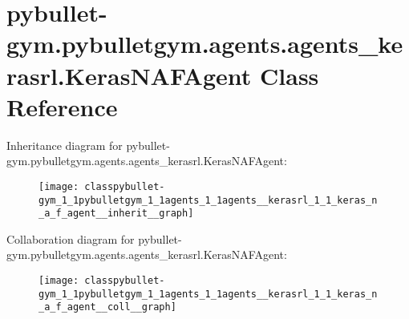 \hypertarget{classpybullet-gym_1_1pybulletgym_1_1agents_1_1agents__kerasrl_1_1_keras_n_a_f_agent}{}\section{pybullet-\/gym.pybulletgym.\+agents.\+agents\+\_\+kerasrl.\+Keras\+N\+A\+F\+Agent Class Reference}
\label{classpybullet-gym_1_1pybulletgym_1_1agents_1_1agents__kerasrl_1_1_keras_n_a_f_agent}


Inheritance diagram for pybullet-\/gym.pybulletgym.\+agents.\+agents\+\_\+kerasrl.\+Keras\+N\+A\+F\+Agent\+:
\nopagebreak
\begin{figure}[H]
\begin{center}
\leavevmode
\texttt{[image: classpybullet-gym\_1\_1pybulletgym\_1\_1agents\_1\_1agents\_\_kerasrl\_1\_1\_keras\_n\_a\_f\_agent\_\_inherit\_\_graph]}
\end{center}
\end{figure}


Collaboration diagram for pybullet-\/gym.pybulletgym.\+agents.\+agents\+\_\+kerasrl.\+Keras\+N\+A\+F\+Agent\+:
\nopagebreak
\begin{figure}[H]
\begin{center}
\leavevmode
\texttt{[image: classpybullet-gym\_1\_1pybulletgym\_1\_1agents\_1\_1agents\_\_kerasrl\_1\_1\_keras\_n\_a\_f\_agent\_\_coll\_\_graph]}
\end{center}
\end{figure}

